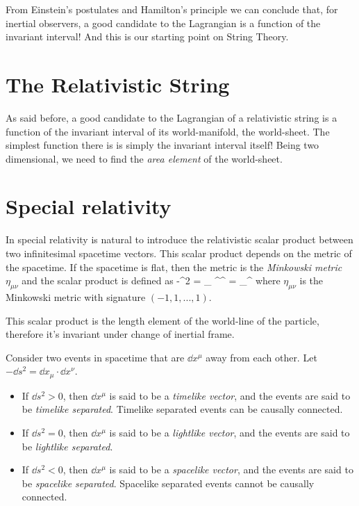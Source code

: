 \documentclass[oneside, 12pt]{book}
\begin{document}
From Einstein's postulates and Hamilton's principle we can conclude that, for inertial observers, a good candidate to the Lagrangian is a function of the invariant interval! And this is our starting point on String Theory.\par 

\section{The Relativistic String}

As said before, a good candidate to the Lagrangian of a relativistic string is a function of the invariant interval of its world-manifold, the world-sheet. The simplest function there is is simply the invariant interval itself! Being two dimensional, we need to find the \textit{area element} of the world-sheet.

\section{Special relativity}

In special relativity is natural to introduce the relativistic scalar product between two infinitesimal spacetime vectors. This scalar product depends on the metric of the spacetime. If the spacetime is flat, then the metric is the \textit{Minkowski metric} \( \eta_{\mu \nu}\) and the scalar product is defined as
\beq -^2 = \eta_{\mu \nu } ^{\mu}^{\nu} = _{\mu}\cdot {}^{\nu}\eeq
where \( \eta_{\mu \nu}\) is the Minkowski metric with signature \((-1,1,...,1)\).\par
This scalar product is the length element of the world-line of the particle, therefore it's invariant under change of inertial frame.\par 
Consider two events in spacetime that are \(\dd{x}^{\mu}\) away from each other. Let \(- \dd{s}^2 = \dd{x}_{\mu}\cdot \dd{x}^{\nu} \). 
\begin{itemize}
    \item If \( \dd{s}^2 > 0\), then \( \dd{x}^{\mu}\) is said to be a \textit{timelike vector}, and the events are said to be \textit{timelike separated}. Timelike separated events can be causally connected.
    \item If \( \dd{s}^2 = 0\), then \( \dd{x}^{\mu}\) is said to be a \textit{lightlike vector}, and the events are said to be \textit{lightlike separated}.
    \item If \( \dd{s}^2 < 0\), then \( \dd{x}^{\mu}\) is said to be a \textit{spacelike vector}, and the events are said to be \textit{spacelike separated}. Spacelike separated events cannot be causally connected.
\end{itemize}
\end{document}
